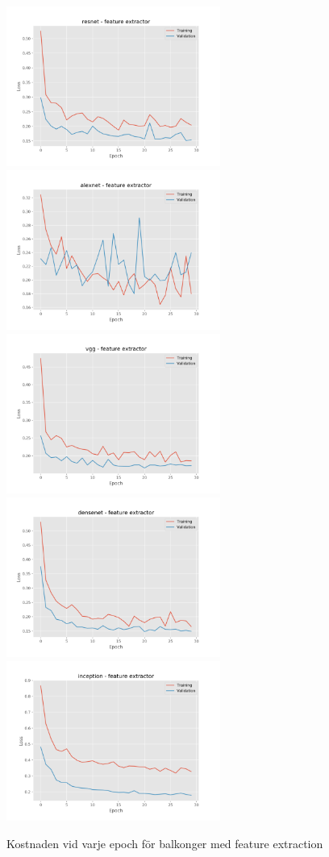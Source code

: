 \documentclass[]{kththesis}
\begin{document}
\begin{figure}[h]
  \includegraphics[width=7cm]{b_l_resnet_fe}
  \includegraphics[width=7cm]{b_l_alexnet_fe}
  \includegraphics[width=7cm]{b_l_vgg_fe}
  \includegraphics[width=7cm]{b_l_densenet_fe}
  \includegraphics[width=7cm]{b_l_inception_fe}
  \caption{Kostnaden vid varje epoch för balkonger med feature extraction}
  \label{fig:b_l_1}
\end{figure}
\end{document}
